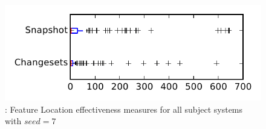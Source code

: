 
\begin{figure}
\centering
\includegraphics[height=0.4\textheight]{figures/flt_seed/rq1_tiny_7}
\caption{\rone: Feature Location effectiveness measures for all subject systems with $seed=7$}
\label{fig:flt_seed:rq1:tiny}
\end{figure}
